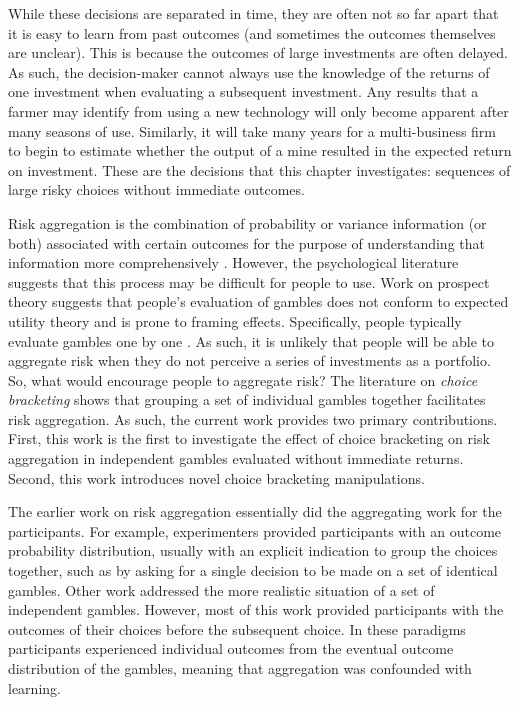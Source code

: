 \documentclass[a4paper, nobind, dvipsnames]{templates/ociamthesis}
\theoremstyle{definition}
\theoremstyle{definition}
\theoremstyle{definition}
\theoremstyle{definition}
\theoremstyle{remark}
\begin{document}
While these decisions are separated in time, they are often not so far apart
that it is easy to learn from past outcomes (and sometimes the outcomes
themselves are unclear). This is because the outcomes of large investments are
often delayed. As such, the decision-maker cannot always use the knowledge of
the returns of one investment when evaluating a subsequent investment. Any
results that a farmer may identify from using a new technology will only become
apparent after many seasons of use. Similarly, it will take many years for a
multi-business firm to begin to estimate whether the output of a mine resulted
in the expected return on investment. These are the decisions that this chapter
investigates: sequences of large risky choices without immediate outcomes.

Risk aggregation is the combination of probability or variance information (or
both) associated with certain outcomes for the purpose of understanding that
information more comprehensively \autocite{bjornsen2019}. However, the psychological
literature suggests that this process may be difficult for people to use. Work
on prospect theory \autocite{kahneman1979} suggests that people's evaluation of gambles
does not conform to expected utility theory and is prone to framing effects.
Specifically, people typically evaluate gambles one by one \autocite{rabin2009,tversky1981,kahneman1993}. As such, it is unlikely that people will be able
to aggregate risk when they do not perceive a series of investments as a
portfolio. So, what would encourage people to aggregate risk? The literature on
\emph{choice bracketing} \autocite{read1999} shows that grouping a set of individual gambles
together facilitates risk aggregation. As such, the current work provides two
primary contributions. First, this work is the first to investigate the effect
of choice bracketing on risk aggregation in independent gambles evaluated
without immediate returns. Second, this work introduces novel choice bracketing
manipulations.

The earlier work on risk aggregation essentially did the aggregating work for
the participants. For example, experimenters provided participants with an
outcome probability distribution, usually with an explicit indication to group
the choices together, such as by asking for a single decision to be made on a
set of identical gambles. Other work addressed the more realistic situation of a
set of independent gambles. However, most of this work provided participants
with the outcomes of their choices before the subsequent choice. In these
paradigms participants experienced individual outcomes from the eventual outcome
distribution of the gambles, meaning that aggregation was confounded with
learning.
\end{document}
